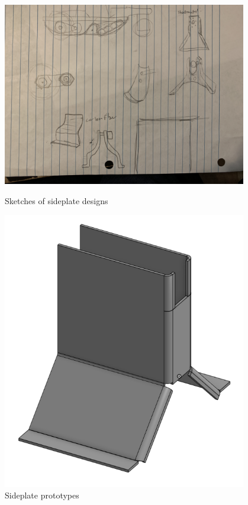 \begin{figure}[ht]
\centering
\begin{minipage}[b]{.48\textwidth}
  \centering
  \includegraphics[width=0.95\textwidth]{Meetings/November/11-26-21/11-26-21_CAD_Figure1 - Nathan Forrer.JPG}
  \caption{Sketches of sideplate designs}
  \label{fig:112621_1}
\end{minipage}%
\hfill%
\begin{minipage}[b]{.48\textwidth}
  \centering
  \includegraphics[width=0.95\textwidth]{Meetings/November/11-26-21/11-26-21_CAD_Figure2 - Nathan Forrer.PNG}
  \caption{Sideplate prototypes}
  \label{fig:112621_2}
\end{minipage}
\end{figure}

